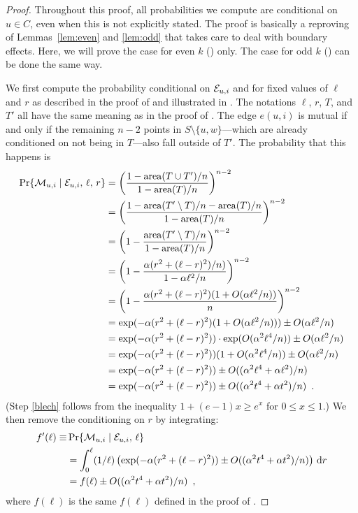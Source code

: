 \documentclass{patmorin}
\DeclareMathOperator{\area}{area}
\begin{document}
\begin{proof}
Throughout this proof, all probabilities we compute are conditional on
$u\in C$, even when this is not explicitly stated.  The proof is basically
a reproving of Lemmas~\ref{lem:even} and \ref{lem:odd} that takes care to
deal with boundary effects.  Here, we will prove the case for even $k$
() only.  The case for odd $k$ () can be done
the same way.

We first compute the probability conditional on $\mathcal{E}_{u,i}$ and for fixed
values of $\ell$ and $r$ as described in the proof of 
and illustrated in .  The notations $\ell$, $r$, $T$,
and $T'$ all have the same meaning as in the proof of .
The edge $e(u,i)$ is mutual if and only if the remaining $n-2$ points
in $S\setminus\{u,w\}$---which are already conditioned on not being in
$T$---also fall outside of $T'$.  The probability that this happens is
\begin{align}
   \Pr\{\mui\mid\eui,\,\ell,\, r\}
        & = \left(\frac{1-\area(T\cup T')/n}{1-\area(T)/n}\right)^{n-2} 
		\notag \\
        & = \left(\frac{1-\area(T'\setminus T)/n - \area(T)/n}
             {1-\area(T)/n}\right)^{n-2} \notag \\
        & = \left(1-\frac{\area(T'\setminus T)/n}{1-\area(T)/n}\right)^{n-2}
		\notag  \\
        & = \left(1-\frac{\alpha(r^2+(\ell-r)^2)/n)}
                       {1-\alpha\ell^2/n}\right)^{n-2} \notag \\
        & = \left(1-\frac{\alpha(r^2+(\ell-r)^2)
               (1+O(\alpha\ell^2/n))}{n} \right)^{n-2} \notag \\
        & = \exp(-\alpha(r^2+(\ell-r)^2)(1+O(\alpha\ell^2/n)))
         \pm O(\alpha\ell^2/n) \notag \\
        & = \exp(-\alpha(r^2+(\ell-r)^2))
            \cdot\exp(O(\alpha^2\ell^4/n)) \pm O(\alpha\ell^2/n) \notag \\
        & = \exp(-\alpha(r^2+(\ell-r)^2))(1+O(\alpha^2\ell^4/n)) 
            \pm O(\alpha\ell^2/n) \eqlabel{blech} \\
        & = \exp(-\alpha(r^2+(\ell-r)^2))
            \pm O((\alpha^2\ell^4+\alpha\ell^2)/n) \notag \\
        & = \exp(-\alpha(r^2+(\ell-r)^2))
            \pm O((\alpha^2 t^4+\alpha t^2)/n) \enspace . \notag
\end{align}
(Step \eqref{blech} follows from the inequality $1+(e-1)x \ge e^{x}$
for $0\le x\le 1$.)  We then remove the conditioning on $r$ by integrating:
\begin{align*}
   f'(\ell) \equiv & \Pr\{\mathcal{M}_{u,i}\mid\mathcal{E}_{u,i},\,\ell\} \\
     & = \int_0^\ell(1/\ell)\left(\exp(-\alpha(r^2+(\ell-r)^2)) 
           \pm O((\alpha^2 t^4+\alpha t^2)/n)\right)\,\mathrm{d}r \\
     & = f(\ell) \pm O((\alpha^2 t^4+\alpha t^2)/n) \enspace ,
\end{align*}
where $f(\ell)$ is the same $f(\ell)$ defined in the proof of .


\end{proof}
\end{document}
